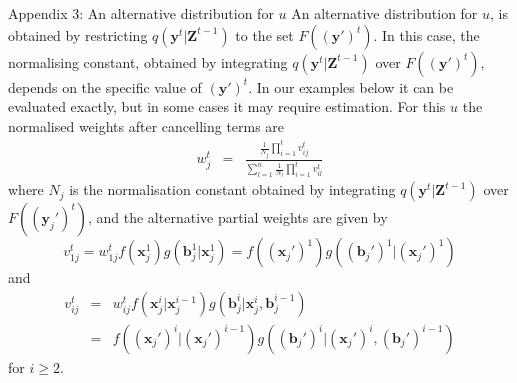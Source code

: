 \documentclass[9pt, xcolor={dvipsnames,svgnames,table}]{beamer}
\begin{document}
\begin{frame}{Appendix 3: An alternative distribution for $u$}
    An alternative distribution for $u$, is obtained by restricting $q(\bm{y}^{t} | \bm{Z}^{t-1})$ to the set $F(\bm{(y')}^{t})$. In this case, the normalising constant, obtained by integrating $q(\bm{y}^{t} | \bm{Z}^{t-1})$ over $F(\bm{(y')}^{t})$, depends on the specific value of $\bm{(y')}^{t}$. In our examples below it can be evaluated exactly, but in some cases it may require estimation. 
    For this $u$ the normalised weights after cancelling terms are
    \begin{eqnarray*}
        w^{t}_j &=& \frac{\frac{1}{N_j} \prod_{i=1}^t v^{t}_{ij}}{\sum_{l=1}^n \frac{1}{N_l}\prod_{i=1}^t v^{t}_{il}}
    \end{eqnarray*}
    where $N_j$ is the normalisation constant obtained by integrating $q(\bm{y}^{t} | \bm{Z}^{t-1})$ over $F((\bm{y}_j')^{t})$, and the alternative partial weights are given by
    \[
        v^{t}_{1j} = w^{t}_{1j} f(\bm{x}_j^1)g(\bm{b}_j^1 | \bm{x}_j^1) = f((\bm{x}_j')^1)g((\bm{b}_j')^1 | (\bm{x}_j')^1)
    \]
    and
    \begin{eqnarray*}
        v^{t}_{ij} &=& w^{t}_{ij} f(\bm{x}_j^i | \bm{x}_j^{i-1}) g(\bm{b}_j^i | \bm{x}_j^i, \bm{b}_j^{i-1}) \\
        &=& f((\bm{x}_j')^i | (\bm{x}_j')^{i-1}) g((\bm{b}_j')^i | (\bm{x}_j')^i, (\bm{b}_j')^{i-1})
    \end{eqnarray*}
    for $i \geq 2$.
\end{frame}
\end{document}
